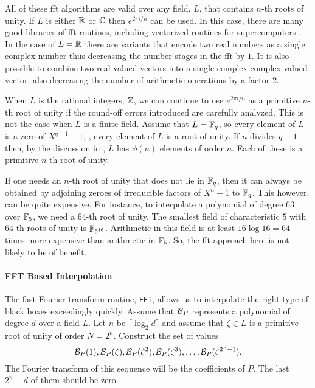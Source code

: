All of these {\sc fft} algorithms are valid over any field, $L$, that
contains $n$-th roots of unity.  If $L$ is either $\mathbb{R}$ or $\mathbb{C}$ then
$e^{2\pi i/n}$ can be used.  In this case, there are many good
libraries of {\sc fft} routines, including vectorized routines for
supercomputers \cite{Swarztrauber84a,Bailey87,Bailey88}.  In the case
of $L = \mathbb{R}$ there are variants that encode two real numbers as a
single complex number thus decreasing the number stages in the {\sc fft} by
$1$.  It is also possible to combine two real valued vectors into a
single complex complex valued vector, also decreasing the number of
arithmetic operations by a factor 2. 

When $L$ is the rational integers, $\mathbb{Z}$, we can continue to use
$e^{2\pi i/n}$ as a primitive $n$-th root of unity if the round-off
errors introduced are carefully analyzed.  This is not the case when
$L$ is a finite field.  Assume that $L = \mathbb{F}_q$, so every element of
$L$ is a zero of $X^{q-1} - 1$, \ie, every element of $L$ is a root of
unity.  If $n$ divides $q-1$ then, by the discussion in
, $L$ has $\phi(n)$ elements of order
$n$.  Each of these is a primitive $n$-th root of unity.   

If one needs an $n$-th root of unity that does not lie in $\mathbb{F}_q$,
then it can always be obtained by adjoining zeroes of irreducible
factors of $X^n-1$ to $\mathbb{F}_q$.  This however, can be quite expensive.
For instance, to interpolate a polynomial of degree $63$ over $\mathbb{F}_5$,
we need a $64$-th root of unity.  The smallest field of
characteristic $5$ with $64$-th roots of unity is $\mathbb{F}_{5^{16}}$.
Arithmetic in this field is at least $16 \log 16 = 64$ times more
expensive than arithmetic in $\mathbb{F}_5$.  So, the {\sc fft} approach here
is not likely to be of benefit.

\paragraph{FFT Based Interpolation}

The fast Fourier transform routine, {\tt FFT}, allows us to
interpolate the right type of black boxes exceedingly quickly.  Assume
that ${\cal B}_P$ represents a polynomial of degree $d$ over a field
$L$.  Let $n$ be $\lceil \log_2 d \rceil$ and assume that $\zeta \in
L$ is a primitive root of unity of
order $N = 2^n$.  Construct the set of values
\[
{\cal B}_P(1), {\cal B}_P(\zeta), {\cal B}_P(\zeta^2), {\cal
B}_P(\zeta^3), \ldots, {\cal B}_P(\zeta^{2^n-1}).
\]
The Fourier transform of this sequence will be the coefficients of
$P$.  The last $2^n - d$ of them should be zero.

